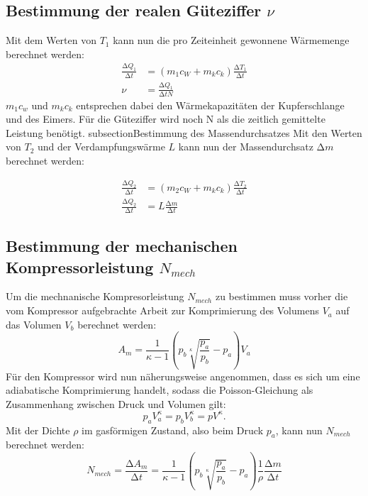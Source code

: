 \subsection*{Bestimmung der realen Güteziffer $\nu$}
Mit dem Werten von $T_1$ kann nun die pro Zeiteinheit gewonnene Wärmemenge berechnet werden:
\begin{align}
  \frac{\increment Q_1}{\increment t} & = (m_1c_W + m_kc_k) \frac{\increment T_1}{\increment t} \\
  \nu                                 & = \frac{\increment Q_1}{\increment t N}
  \label{eqn:Gueteziffer}
\end{align}
$m_1c_w$ und $m_k c_k$ entsprechen dabei den Wärmekapazitäten der Kupferschlange und des Eimers.
Für die Güteziffer wird noch N als die zeitlich gemittelte Leistung benötigt.
subsection{Bestimmung des Massendurchsatzes}
Mit den Werten von $T_2$ und der Verdampfungswärme $L$ kann nun der Massendurchsatz $\increment m $
berechnet werden:

\begin{align}
  \label{eqn:Massendurchsatz}
  \frac{\increment Q_2}{\increment t} & = (m_2 c_W + m_k c_k) \frac{\increment T_2}{\increment t} \\
  \frac{\increment Q_2}{\increment t} & = L \frac{\increment m}{\increment t}
\end{align}

\subsection{Bestimmung der mechanischen Kompressorleistung \texorpdfstring{$N_{mech}$}{t} }

Um die mechnanische Kompresorleistung $N_{mech}$ zu bestimmen muss vorher die vom Kompressor aufgebrachte
Arbeit zur Komprimierung des Volumens $V_a$ auf das Volumen $V_b$ berechnet werden:
\begin{equation}
  \label{eqn:Am}
  A_m = \frac{1}{\kappa - 1} \left( p_b \sqrt[\kappa]{\frac{p_a}{p_b}} - p_a \right) V_a
\end{equation}
Für den Kompressor wird nun näherungsweise angenommen, dass es sich um eine adiabatische Komprimierung handelt,
sodass die Poisson-Gleichung als Zusammenhang zwischen Druck und Volumen gilt:
\begin{equation}
  p_a V^{\kappa}_a = p_b V^{\kappa}_b = p V^{\kappa} .
\end{equation}
Mit der Dichte $\rho$ im gasförmigen Zustand, also beim Druck $p_a$, kann nun $N_{mech}$ berechnet werden:
\begin{equation}
  \label{eqn:Nmech}
  N_{mech} = \frac{\increment A_m}{\increment t} =  \frac{1}{\kappa - 1} \left( p_b \sqrt[\kappa]{\frac{p_a}{p_b}} - p_a \right) \frac{1}{\rho} \frac{\increment m}{\increment t}
\end{equation}

